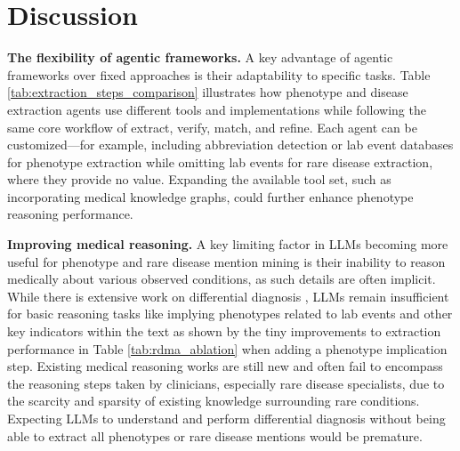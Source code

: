 \section{Discussion} \label{sec: discussion}
\textbf{The flexibility of agentic frameworks.} A key advantage of agentic frameworks over fixed approaches is their adaptability to specific tasks. Table \ref{tab:extraction_steps_comparison} illustrates how phenotype and disease extraction agents use different tools and implementations while following the same core workflow of extract, verify, match, and refine. Each agent can be customized—for example, including abbreviation detection or lab event databases for phenotype extraction while omitting lab events for rare disease extraction, where they provide no value. Expanding the available tool set, such as incorporating medical knowledge graphs, could further enhance phenotype reasoning performance.

\textbf{Improving medical reasoning.} A key limiting factor in LLMs becoming more useful for phenotype and rare disease mention mining is their inability to reason medically about various observed conditions, as such details are often implicit. While there is extensive work on differential diagnosis \cite{chen2024rarebenchllmsserverare,chen2025rareagentsadvancingraredisease, germain2025applyingAI_RD}, LLMs remain insufficient for basic reasoning tasks like implying phenotypes related to lab events and other key indicators within the text as shown by the tiny improvements to extraction performance in Table \ref{tab:rdma_ablation} when adding a phenotype implication step. Existing medical reasoning works are still new and often fail to encompass the reasoning steps taken by clinicians, especially rare disease specialists, due to the scarcity and sparsity of existing knowledge surrounding rare conditions. Expecting LLMs to understand and perform differential diagnosis without being able to extract all phenotypes or rare disease mentions would be premature.

